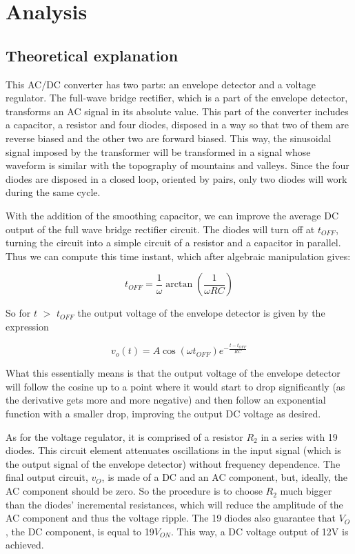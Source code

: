 \section{Analysis}
\label{sec:analysis}
\subsection{Theoretical explanation}
This AC/DC converter has two parts: an envelope detector and a voltage regulator.
The full-wave bridge rectifier, which is a part of the envelope detector, transforms an AC signal in its absolute value. This part of the converter includes a capacitor, a resistor and four diodes, disposed in a way so that two of them are reverse biased and the other two are forward biased. This way, the sinusoidal signal imposed by the transformer will be transformed in a signal whose waveform is similar with the topography of mountains and valleys. Since the four diodes are disposed in a closed loop, oriented by pairs, only two diodes will work during the same cycle. 

With the addition of the smoothing capacitor, we can improve the average DC output of the full wave bridge rectifier circuit. The diodes will turn off at $t_{OFF}$, turning the circuit into a simple circuit of a resistor and a capacitor in parallel. Thus we can compute this time instant, which after algebraic manipulation gives:

\begin{equation}
    t_{OFF} = \frac{1}{\omega} \arctan(\frac{1}{\omega RC})
\end{equation}

So for $t$ $>$ $t_{OFF}$ the output voltage of the envelope detector is given by the expression

\begin{equation}
    v_o(t) = A\cos(\omega t_{OFF}) e^{-\frac{t-t_{OFF}}{RC}}
\end{equation}

What this essentially means is that the output voltage of the envelope detector will follow the cosine up to a point where it would start to drop significantly (as the derivative gets more and more negative) and then follow an exponential function with a smaller drop, improving the output DC voltage as desired.

As for the voltage regulator, it is comprised of a resistor $R_2$ in a series with 19 diodes. This circuit element attenuates oscillations in the input signal (which is the output signal of the envelope detector) without frequency dependence. The final output circuit, $v_O$, is made of a DC and an AC component, but, ideally, the AC component should be zero. So the procedure is to choose $R_2$ much bigger than the diodes' incremental resistances, which will reduce the amplitude of the AC component and thus the voltage ripple. The 19 diodes also guarantee that $V_O$, the DC component, is equal to 19$V_{ON}$. This way, a DC voltage output of 12V is achieved.



